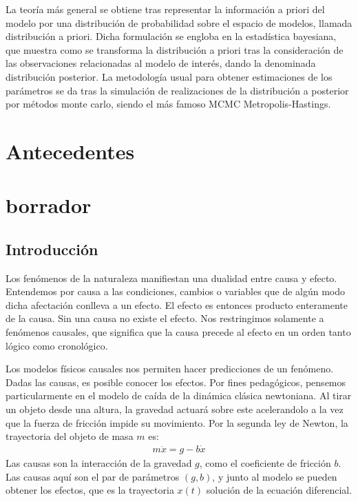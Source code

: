 \documentclass{article}
\begin{document}
La teoría más general se obtiene tras representar la información a priori del modelo por una distribución de probabilidad sobre el espacio de modelos, llamada distribución a priori. Dicha formulación se engloba en la estadística bayesiana, que muestra como se transforma la distribución a priori tras la consideración de las observaciones relacionadas al modelo de interés, dando la denominada distribución posterior. La metodología usual para obtener estimaciones de los parámetros se da tras la simulación de realizaciones de la distribución a posterior por métodos monte carlo, siendo el más famoso MCMC Metropolis-Hastings. 













\section*{Antecedentes}






\newpage


\section*{borrador}
\subsection*{Introducción}

Los fenómenos de la naturaleza manifiestan una dualidad entre causa y efecto. Entendemos por causa a las condiciones, cambios o variables que de algún modo dicha afectación conlleva a un efecto. El efecto es entonces producto enteramente de la causa. Sin una causa no existe el efecto. Nos restringimos solamente a fenómenos causales, que significa que la causa precede al efecto en un orden tanto lógico como cronológico.

Los modelos físicos causales nos permiten hacer predicciones de un fenómeno. Dadas las causas, es posible conocer los efectos. Por fines pedagógicos, pensemos particularmente en el modelo de caída de la dinámica clásica newtoniana. Al tirar un objeto desde una altura, la gravedad actuará sobre este acelerandolo a la vez que la fuerza de fricción impide su movimiento. Por la segunda ley de Newton, la trayectoria del objeto de masa $m$ es:
\begin{align*}
    m\ddot{x} = g - b \dot{x}
\end{align*}
Las causas son la interacción de la gravedad $g$, como el coeficiente de fricción $b$. Las causas aquí son el par de parámetros $(g,b)$, y junto al modelo se pueden obtener los efectos, que es la trayectoria $x(t)$ solución de la ecuación diferencial. 
\end{document}

